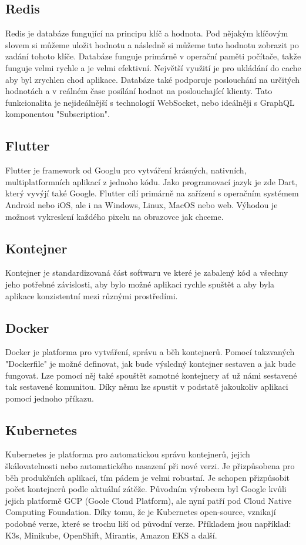 \subsection{Redis}
Redis je databáze fungující na principu klíč a hodnota. Pod nějakým klíčovým slovem si můžeme uložit hodnotu a následně si můžeme tuto hodnotu zobrazit po zadání tohoto klíče. Databáze funguje primárně v operační paměti počítače, takže funguje velmi rychle a je velmi efektivní. Největší využití je pro ukládání do cache aby byl zrychlen chod aplikace. Databáze také podporuje poslouchání na určitých hodnotách a v reálném čase posílání hodnot na poslouchající klienty. Tato funkcionalita je nejideálnější s technologií WebSocket, nebo ideálněji s GraphQL komponentou "Subscription".

\subsection{Flutter}
Flutter je framework od Googlu pro vytváření krásných, nativních, multiplatformních aplikací z jednoho kódu. \cite{Flutter} Jako programovací jazyk je zde Dart, který vyvýjí také Google. Flutter cílí primárně na zařízení s operačním systémem Android nebo iOS, ale i na Windows, Linux, MacOS nebo web. Výhodou je možnost vykreslení každého pixelu na obrazovce jak chceme.

\subsection{Kontejner}
Kontejner je standardizovaná část softwaru ve které je zabalený kód a všechny jeho potřebné závislosti, aby bylo možné aplikaci rychle spuštět a aby byla aplikace konzistentní mezi různými prostředími. \cite{Kontejner}

\subsection{Docker}
Docker je platforma pro vytváření, správu a běh kontejnerů. Pomocí takzvaných "Dockerfile" je možné definovat, jak bude výsledný kontejner sestaven a jak bude fungovat. Lze pomocí něj také spouštět samotné kontejnery ať už námi sestavené tak sestavené komunitou. Díky němu lze spustit v podstatě jakoukoliv aplikaci pomocí jednoho příkazu.

\subsection{Kubernetes}
Kubernetes je platforma pro automatickou správu kontejnerů, jejich škálovatelnosti nebo automatického nasazení při nové verzi. Je přizpůsobena pro běh produkčních aplikací, tím pádem je velmi robustní. Je schopen přizpůsobit počet kontejnerů podle aktuální zátěže. Původním výrobcem byl Google kvůli jejich platformě GCP (Goole Cloud Platform), ale nyní patří pod Cloud Native Computing Foundation. Díky tomu, že je Kubernetes open-source, vznikají podobné verze, které se trochu liší od původní verze. Příkladem jsou například: K3s, Minikube, OpenShift, Mirantis, Amazon EKS a další.

